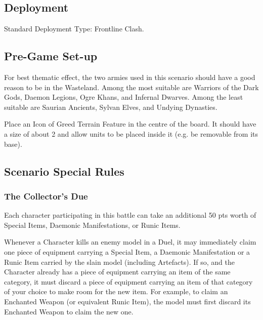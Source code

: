 
\label{TheGatesofGreed}


\subsection*{Deployment}

Standard Deployment Type: Frontline Clash.


\subsection*{Pre-Game Set-up}

For best thematic effect, the two armies used in this scenario should have a good reason to be in the Wasteland. Among the most suitable are Warriors of the Dark Gods, Daemon Legions, Ogre Khans, and Infernal Dwarves. Among the least suitable are Saurian Ancients, Sylvan Elves, and Undying Dynasties. 

Place an Icon of Greed Terrain Feature in the centre of the board. It should have a size of about 2\timess{} and allow units to be placed inside it (e.g. be removable from its base).

\subsection*{Scenario Special Rules}

\subsubsection*{The Collector's Due}

Each character participating in this battle can take an additional 50 pts worth of Special Items, Daemonic Manifestations, or Runic Items.

Whenever a Character kills an enemy model in a Duel, it may immediately claim one piece of equipment carrying a Special Item, a Daemonic Manifestation or a Runic Item carried by the slain model (including Artefacts). If so, and the Character already has a piece of equipment carrying an item of the same category, it must discard a piece of equipment carrying an item of that category of your choice to make room for the new item. For example, to claim an Enchanted Weapon (or equivalent Runic Item), the model must first discard its Enchanted Weapon to claim the new one.

